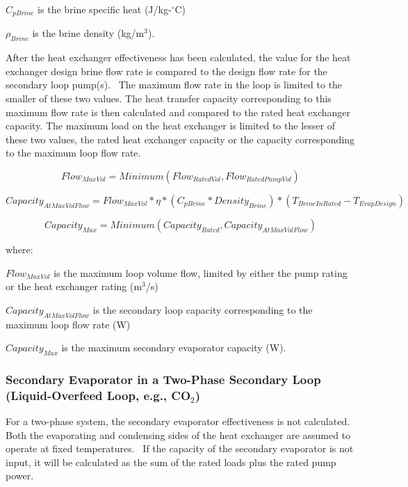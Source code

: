 \(C_{pBrine}\) is the brine specific heat (J/kg-\(^{\circ}\)C)

\(\rho_{Brine}\) is the brine density (kg/m\(^{3}\)).

After the heat exchanger effectiveness has been calculated, the value for the heat exchanger design brine flow rate is compared to the design flow rate for the secondary loop pump(s).~ The maximum flow rate in the loop is limited to the smaller of these two values. The heat transfer capacity corresponding to this maximum flow rate is then calculated and compared to the rated heat exchanger capacity. The maximum load on the heat exchanger is limited to the lesser of these two values, the rated heat exchanger capacity or the capacity corresponding to the maximum loop flow rate.

\begin{equation}
Flow_{MaxVol} = Minimum(Flow_{RatedVol}, Flow_{RatedPumpVol})
\end{equation}

\begin{equation}
Capacity_{AtMaxVolFlow} = Flow_{MaxVol} * \eta *( C_{pBrine} * Density_{Brine})*( T_{BrineInRated} - T_{EvapDesign})
\end{equation}

\begin{equation}
Capacity_{Max} = Minimum(Capacity_{Rated}, Capacity_{AtMaxVolFlow})
\end{equation}

where:

\(Flow_{MaxVol}\) is the maximum loop volume flow, limited by either the pump rating or the heat exchanger rating (m\(^{3}\)/s)

\(Capacity_{AtMaxVolFlow}\) is the secondary loop capacity corresponding to the maximum loop flow rate (W)

\(Capacity_{Max}\) is the maximum secondary evaporator capacity (W).

\subsubsection{Secondary Evaporator in a Two-Phase Secondary Loop~ (Liquid-Overfeed Loop, e.g., CO\(_{2}\))}\label{secondary-evaporator-in-a-two-phase-secondary-loop-liquid-overfeed-loop-e.g.-coux5f2}

For a two-phase system, the secondary evaporator effectiveness is not calculated. Both the evaporating and condensing sides of the heat exchanger are assumed to operate at fixed temperatures.~ If the capacity of the secondary evaporator is not input, it will be calculated as the sum of the rated loads plus the rated pump power.

